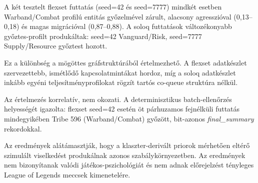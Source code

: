 A két tesztelt flexset futtatás (seed=42 és seed=7777) mindkét esetben Warband/Combat profilú entitás győzelmével zárult, alacsony agresszióval (0{,}13--0{,}18) és magas migrációval (0{,}87--0{,}88). A soloq futtatások változékonyabb győztes-profilt produkáltak: seed=42 Vanguard/Risk, seed=7777 Supply/Resource győztest hozott.

Ez a különbség a mögöttes gráfstruktúrából értelmezhető. A flexset adatkészlet szervezettebb, ismétlődő kapcsolatmintákat hordoz, míg a soloq adatkészlet inkább egyéni teljesítményprofilokat rögzít tartós co-queue struktúra nélkül.

Az értelmezés korrelatív, nem okozati. A determinisztikus batch-ellenőrzés helyességét igazolta: flexset seed=42 esetén öt párhuzamos fejnélküli futtatás mindegyikében Tribe 596 (Warband/Combat) győzött, bit-azonos \textit{final\_summary} rekordokkal.

Az eredmények alátámasztják, hogy a klaszter-derivált priorok mérhetően eltérő szimulált viselkedést produkálnak azonos szabálykörnyezetben. Az eredmények nem bizonyítanak valódi játékos-pszichológiát és nem adnak előrejelzést tényleges League of Legends meccsek kimenetelére.
